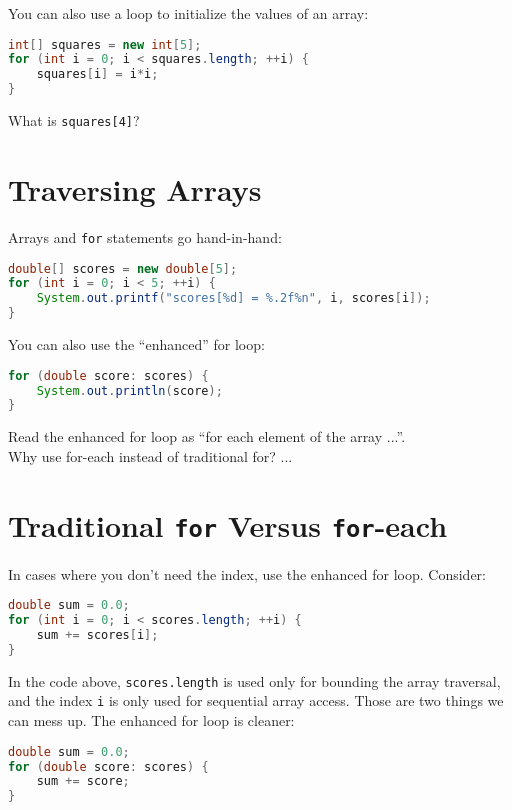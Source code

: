 \documentclass{article}
\begin{document}
You can also use a loop to initialize the values of an array:
\begin{lstlisting}[language=Java]
int[] squares = new int[5];
for (int i = 0; i < squares.length; ++i) {
    squares[i] = i*i;
}
\end{lstlisting}

What is {\tt squares[4]}?


\section{Traversing Arrays}


Arrays and {\tt for} statements go hand-in-hand:
\begin{lstlisting}[language=Java]
double[] scores = new double[5];
for (int i = 0; i < 5; ++i) {
    System.out.printf("scores[%d] = %.2f%n", i, scores[i]);
}
\end{lstlisting}

You can also use the ``enhanced'' for loop:

\begin{lstlisting}[language=Java]
for (double score: scores) {
    System.out.println(score);
}
\end{lstlisting}

Read the enhanced for loop as ``for each element of the array ...''.\\

Why use for-each instead of traditional for? ...


\section{Traditional {\tt for} Versus {\tt for}-each}


In cases where you don't need the index, use the enhanced for loop.  Consider:

\begin{lstlisting}[language=Java]
double sum = 0.0;
for (int i = 0; i < scores.length; ++i) {
    sum += scores[i];
}
\end{lstlisting}

In the code above, {\tt scores.length} is used only for bounding the array traversal, and the index {\tt i} is only used for sequential array access.  Those are two things we can mess up.  The enhanced for loop is cleaner:

\begin{lstlisting}[language=Java]
double sum = 0.0;
for (double score: scores) {
    sum += score;
}
\end{lstlisting}
\end{document}
